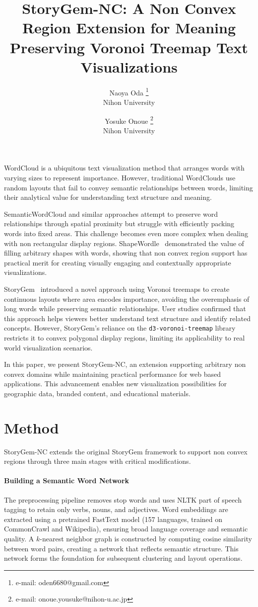 \documentclass{vgtc}                          %
\title{StoryGem-NC: A Non Convex Region Extension for Meaning Preserving Voronoi Treemap Text Visualizations}
\author{Naoya Oda \thanks{e-mail: oden6680@gmail.com}\\ \scriptsize Nihon University %
\and Yosuke Onoue \thanks{e-mail: onoue.yousuke@nihon-u.ac.jp}\\ \scriptsize Nihon University}
\begin{document}
\maketitle

WordCloud is a ubiquitous text visualization method that arranges words with varying sizes to represent importance.
However, traditional WordClouds use random layouts that fail to convey semantic relationships between words, limiting their analytical value for understanding text structure and meaning.

SemanticWordCloud and similar approaches attempt to preserve word relationships through spatial proximity but struggle with efficiently packing words into fixed areas.
This challenge becomes even more complex when dealing with non rectangular display regions.
ShapeWordle~\cite{8807355} demonstrated the value of filling arbitrary shapes with words, showing that non convex region support has practical merit for creating visually engaging and contextually appropriate visualizations.

StoryGem~\cite{oda2025storygemvoronoitreemapapproach} introduced a novel approach using Voronoi treemaps to create continuous layouts where area encodes importance, avoiding the overemphasis of long words while preserving semantic relationships.
User studies confirmed that this approach helps viewers better understand text structure and identify related concepts.
However, StoryGem's reliance on the \texttt{d3-voronoi-treemap} library restricts it to convex polygonal display regions, limiting its applicability to real world visualization scenarios.

In this paper, we present StoryGem-NC, an extension supporting arbitrary non convex domains while maintaining practical performance for web based applications.
This advancement enables new visualization possibilities for geographic data, branded content, and educational materials.

\section{Method}

StoryGem-NC extends the original StoryGem framework to support non convex regions through three main stages with critical modifications.

\paragraph{Building a Semantic Word Network}
The preprocessing pipeline removes stop words and uses NLTK part of speech tagging to retain only verbs, nouns, and adjectives.
Word embeddings are extracted using a pretrained FastText model (157 languages, trained on CommonCrawl and Wikipedia), ensuring broad language coverage and semantic quality.
A $k$-nearest neighbor graph is constructed by computing cosine similarity between word pairs, creating a network that reflects semantic structure.
This network forms the foundation for subsequent clustering and layout operations.
\end{document}
